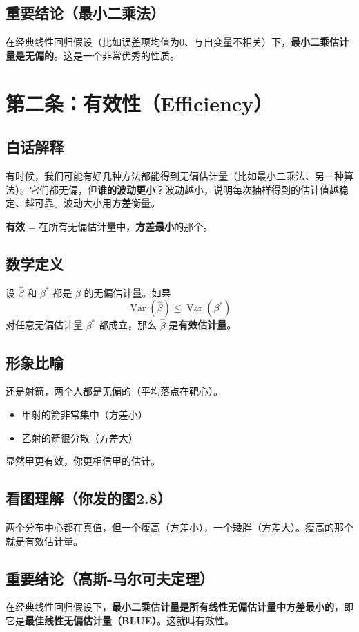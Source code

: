 \documentclass[a4paper,12pt]{article}
\begin{document}
\subsection*{重要结论（最小二乘法）}
在经典线性回归假设（比如误差项均值为0、与自变量不相关）下，\textbf{最小二乘估计量是无偏的}。这是一个非常优秀的性质。

\section{第二条：有效性（Efficiency）}

\subsection*{白话解释}
有时候，我们可能有好几种方法都能得到无偏估计量（比如最小二乘法、另一种算法）。它们都无偏，但\textbf{谁的波动更小}？波动越小，说明每次抽样得到的估计值越稳定、越可靠。波动大小用\textbf{方差}衡量。

\textbf{有效} = 在所有无偏估计量中，\textbf{方差最小}的那个。

\subsection*{数学定义}
设 \(\hat{\beta}\) 和 \(\beta^*\) 都是 \(\beta\) 的无偏估计量。如果
\[
\operatorname{Var}(\hat{\beta}) \le \operatorname{Var}(\beta^*)
\]
对任意无偏估计量 \(\beta^*\) 都成立，那么 \(\hat{\beta}\) 是\textbf{有效估计量}。

\subsection*{形象比喻}
还是射箭，两个人都是无偏的（平均落点在靶心）。  
\begin{itemize}
    \item 甲射的箭非常集中（方差小）  
    \item 乙射的箭很分散（方差大）  
\end{itemize}
显然甲更有效，你更相信甲的估计。

\subsection*{看图理解（你发的图2.8）}
两个分布中心都在真值，但一个瘦高（方差小），一个矮胖（方差大）。瘦高的那个就是有效估计量。

\subsection*{重要结论（高斯-马尔可夫定理）}
在经典线性回归假设下，\textbf{最小二乘估计量是所有线性无偏估计量中方差最小的}，即它是\textbf{最佳线性无偏估计量（BLUE）}。这就叫有效性。
\end{document}
